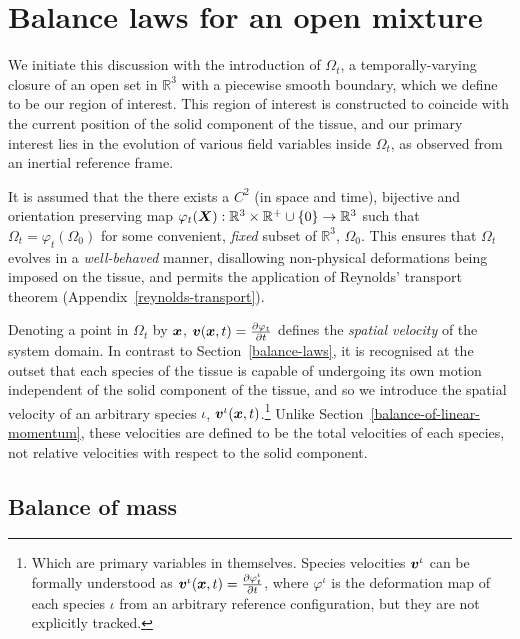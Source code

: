 \section{Balance laws for an open mixture}
\label{eu-balance-laws}

 We initiate this discussion with the introduction of $\Omega_{t}$, a
 temporally-varying closure of an open set in $\mathbb{R}^{3}$ with a
 piecewise smooth boundary, which we define to be our region of
 interest. This region of interest is constructed to coincide with the
 current position of the solid component of the tissue, and our
 primary interest lies in the evolution of various field variables
 inside $\Omega_{t}$, as observed from an inertial reference frame.

It is assumed that the there exists a {$\mathit{C}^{2}$} (in space and
time), bijective and orientation preserving map $\varphi_{t}(\mbox{\boldmath$ X$}):
\mathbb{R}^3\times\mathbb{R}^{+}\cup\{0\} \rightarrow\mathbb{R}^{3}$
such that $\Omega_{t} = \varphi_{t} (\Omega_{0})$ for some convenient,
{\em fixed} subset of $\mathbb{R}^{3}$, $\Omega_{0}$. This ensures
that $\Omega_{t}$ evolves in a {\em well-behaved} manner, disallowing
non-physical deformations being imposed on the tissue, and permits the
application of Reynolds' transport theorem
(Appendix~\ref{reynolds-transport}).

Denoting a point in $\Omega_{t}$ by $\mbox{\boldmath$ x$}$, $\mbox{\boldmath$ v$}(\mbox{\boldmath$ x$},t) =
\frac{\partial \varphi_{t}}{\partial t}$ defines the {\em spatial
  velocity} of the system domain. In contrast to
Section~\ref{balance-laws}, it is recognised at the outset that each
species of the tissue is capable of undergoing its own motion
independent of the solid component of the tissue, and so we introduce
the spatial velocity of an arbitrary species $\iota$,
$\mbox{\boldmath$ v$}^{\iota}(\mbox{\boldmath$ x$},t)$.\footnote{Which are primary variables in
  themselves. Species velocities $\mbox{\boldmath$ v$}^{\iota}$ can be formally
  understood as $\mbox{\boldmath$ v$}^{\iota}(\mbox{\boldmath$ x$},t) = \frac{\partial
    \varphi^{\iota}_{t}}{\partial t}$, where $\varphi^{\iota}$ is the
  deformation map of each species $\iota$ from an arbitrary reference
  configuration, but they are not explicitly tracked.} Unlike
Section~\ref{balance-of-linear-momentum}, these velocities are defined
to be the total velocities of each species, not relative velocities
with respect to the solid component.

\subsection{Balance of mass}
\label{eu-balance-of-mass}

